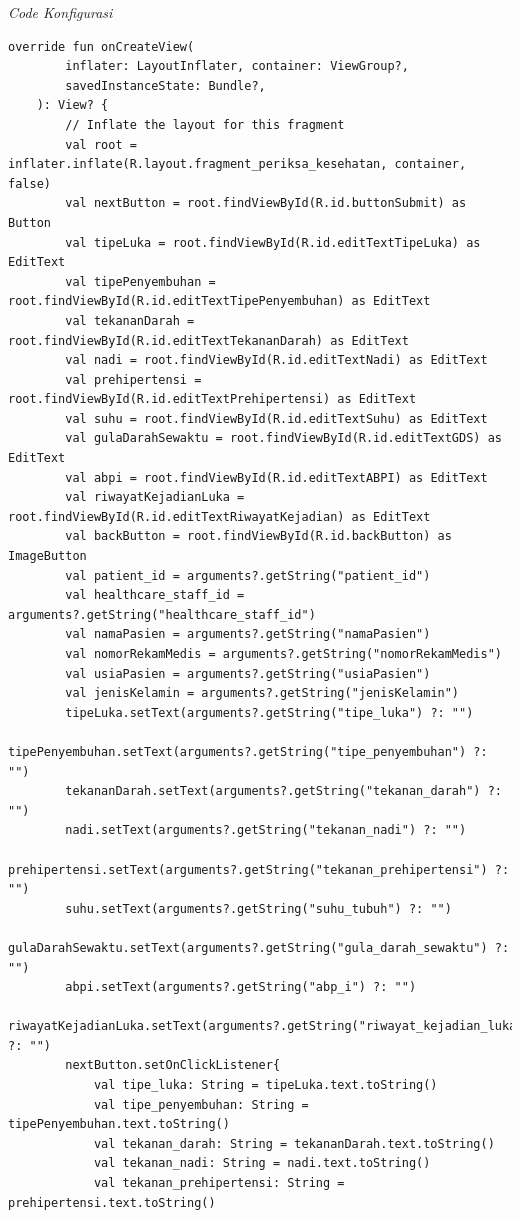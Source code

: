 \begin{enumerate}
	\textit{Code Konfigurasi}
	\begin{lstlisting}
override fun onCreateView(
        inflater: LayoutInflater, container: ViewGroup?,
        savedInstanceState: Bundle?,
    ): View? {
        // Inflate the layout for this fragment
        val root = inflater.inflate(R.layout.fragment_periksa_kesehatan, container, false)
        val nextButton = root.findViewById(R.id.buttonSubmit) as Button
        val tipeLuka = root.findViewById(R.id.editTextTipeLuka) as EditText
        val tipePenyembuhan = root.findViewById(R.id.editTextTipePenyembuhan) as EditText
        val tekananDarah = root.findViewById(R.id.editTextTekananDarah) as EditText
        val nadi = root.findViewById(R.id.editTextNadi) as EditText
        val prehipertensi = root.findViewById(R.id.editTextPrehipertensi) as EditText
        val suhu = root.findViewById(R.id.editTextSuhu) as EditText
        val gulaDarahSewaktu = root.findViewById(R.id.editTextGDS) as EditText
        val abpi = root.findViewById(R.id.editTextABPI) as EditText
        val riwayatKejadianLuka = root.findViewById(R.id.editTextRiwayatKejadian) as EditText
        val backButton = root.findViewById(R.id.backButton) as ImageButton
        val patient_id = arguments?.getString("patient_id")
        val healthcare_staff_id = arguments?.getString("healthcare_staff_id")
        val namaPasien = arguments?.getString("namaPasien")
        val nomorRekamMedis = arguments?.getString("nomorRekamMedis")
        val usiaPasien = arguments?.getString("usiaPasien")
        val jenisKelamin = arguments?.getString("jenisKelamin")
        tipeLuka.setText(arguments?.getString("tipe_luka") ?: "")
        tipePenyembuhan.setText(arguments?.getString("tipe_penyembuhan") ?: "")
        tekananDarah.setText(arguments?.getString("tekanan_darah") ?: "")
        nadi.setText(arguments?.getString("tekanan_nadi") ?: "")
        prehipertensi.setText(arguments?.getString("tekanan_prehipertensi") ?: "")
        suhu.setText(arguments?.getString("suhu_tubuh") ?: "")
        gulaDarahSewaktu.setText(arguments?.getString("gula_darah_sewaktu") ?: "")
        abpi.setText(arguments?.getString("abp_i") ?: "")
        riwayatKejadianLuka.setText(arguments?.getString("riwayat_kejadian_luka") ?: "")
        nextButton.setOnClickListener{
            val tipe_luka: String = tipeLuka.text.toString()
            val tipe_penyembuhan: String = tipePenyembuhan.text.toString()
            val tekanan_darah: String = tekananDarah.text.toString()
            val tekanan_nadi: String = nadi.text.toString()
            val tekanan_prehipertensi: String = prehipertensi.text.toString()

\end{lstlisting}
\end{enumerate}
